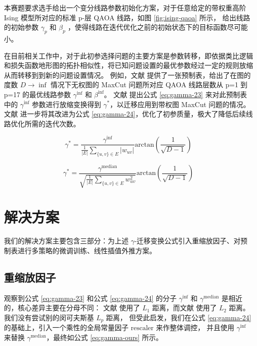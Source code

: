\documentclass[withoutpreface,bwprint]{cumcmthesis}
\begin{document}
本赛题要求选手给出一个变分线路参数初始化方案，对于任意给定的带权重高阶 Ising 模型所对应的标准 p-层 QAOA 线路，如图 \ref{fig:ising-qaoa} 所示，
给出线路的初始参数 $ \gamma_p $ 和 $ \beta_p $ ，使得线路在迭代优化之前的初始状态下的目标函数尽可能小。

在目前相关工作中，对于此初参选择问题的主要方案是参数转移，即依据类比逻辑和损失函数地形图的拓扑相似性，将已知问题设置的最优参数经过一定的规则放缩从而转移到到新的问题设置情况。
例如，文献 \cite{Basso2022} 提供了一张预制表，给出了在图的度数 $ D \rightarrow \inf $ 情况下无权图的 MaxCut 问题所对应 QAOA 线路层数从 p=1 到 p=17 的最优线路参数 $ \gamma^\mathrm{inf} $ 和 $ \beta^\mathrm{inf} $。
文献 \cite{Shaydulin2023} 提出公式 \ref{eq:gamma-23} 来对此预制表中的 $ \gamma^\mathrm{inf} $ 参数进行放缩变换得到 $ \gamma^\ast $，以迁移应用到带权图 MaxCut 问题的情况。
文献 \cite{Sureshbabu2024} 进一步将其改进为公式 \ref{eq:gamma-24}，优化了初参质量，极大了降低后续线路优化所需的迭代次数。

\begin{equation}
\gamma^\ast = \frac{\gamma^{\mathrm{inf}}}{\frac{1}{|E|} \sum_{\{u,v\} \in E} |w_{uv}|} \mathrm{arctan}(\frac{1}{\sqrt{D-1}})
\label{eq:gamma-23}
\end{equation}

\begin{equation}
\gamma^\ast = \frac{\gamma^{\mathrm{median}}}{\sqrt{\frac{1}{|E|} \sum_{\{u,v\} \in E} w_{uv}^2}} \mathrm{arctan}(\frac{1}{\sqrt{D-1}})
\label{eq:gamma-24}
\end{equation}


\section{解决方案}

我们的解决方案主要包含三部分：为上述 $ \gamma $-迁移变换公式引入重缩放因子、对预制表进行多策略的微调训练、线性插值外推方案。

\subsection{重缩放因子}

观察到公式 \ref{eq:gamma-23} 和公式 \ref{eq:gamma-24} 的分子 $ \gamma^\mathrm{inf} $ 和 $ \gamma^\mathrm{median} $ 是相近的，核心差异主要在分母不同：
文献 \cite{Shaydulin2023} 使用了 $ L_1 $ 距离，而文献 \cite{Sureshbabu2024} 使用了 $ L_2 $ 距离。
我们没有尝试别的闵可夫斯基 $ L_p $ 距离， 但受此启发，我们在公式 \ref{eq:gamma-24} 的基础上，引入一个乘性的全局常量因子 $ \mathrm{rescaler} $ 来作整体调控，
并且使用 $ \gamma^\mathrm{inf} $ 来替换 $ \gamma^\mathrm{median} $，最终如公式 \ref{eq:gamma-ours} 所示。
\end{document}
